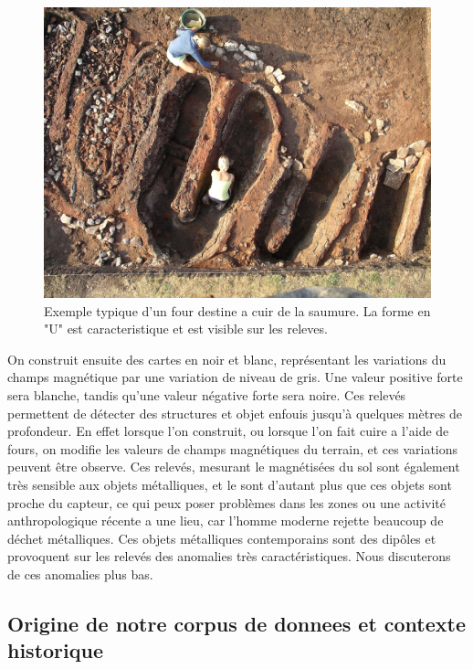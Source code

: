 \documentclass[a4paper, 12pt, titlepage, oneside, french]{article}
\begin{document}
\begin{figure}[H]
	\centering
		\includegraphics[width =\textwidth]{Four.jpg}
		\caption{Exemple typique d'un four destine a cuir de la saumure. La forme en "U" est caracteristique et est visible sur les releves.}
		\label{fig:ExempleFour}
\end{figure}

	On construit ensuite des cartes en noir et blanc, représentant les variations du champs magnétique par une variation de niveau de gris. Une valeur positive forte sera blanche, tandis qu'une valeur négative forte sera noire. Ces relevés permettent de détecter des structures et objet enfouis jusqu'à quelques mètres de profondeur. En effet lorsque l'on construit, ou lorsque l'on fait cuire a l'aide de fours, on modifie les valeurs de champs magnétiques du terrain, et ces variations peuvent être observe. Ces relevés, mesurant le magnétisées du sol sont également très sensible aux objets métalliques, et le sont d'autant plus que ces objets sont proche du capteur, ce qui peux poser problèmes dans les zones ou une activité anthropologique récente a une lieu, car l'homme moderne rejette beaucoup de déchet métalliques. Ces objets métalliques contemporains sont des dipôles et provoquent sur les relevés des anomalies très caractéristiques. Nous discuterons de ces anomalies plus bas.
	
	\newpage
	\subsection{Origine de notre corpus de donnees et contexte historique}
\end{document}
